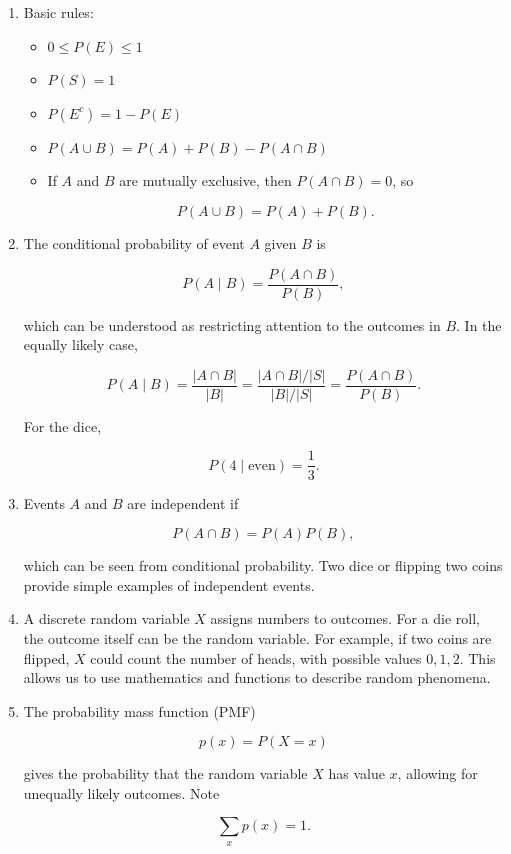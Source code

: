 \documentclass{article}
\begin{document}
\begin{enumerate}
\begin{enumerate}
For event $E={2,4,6}$, an even roll,

$$
P(E)=\frac{|E|}{|S|}=\frac{3}{6}=\frac{1}{2}.
$$

\item Basic rules:
\begin{itemize}
\item $0 \leq P(E) \leq 1$
\item $P(S)=1$
\item $P(E^c)=1-P(E)$
\item $P(A\cup B)=P(A)+P(B)-P(A\cap B)$
\item If $A$ and $B$ are mutually exclusive, then $P(A\cap B)=0$, so

$$
P(A\cup B)=P(A)+P(B).
$$

\end{itemize}

\item The conditional probability of event $A$ given $B$ is

$$
P(A\mid B)=\frac{P(A\cap B)}{P(B)},
$$

which can be understood as restricting attention to the outcomes in $B$. In the equally likely case,

$$
P(A\mid B)=\frac{|A\cap B|}{|B|}
=\frac{|A\cap B|/|S|}{|B|/|S|}
=\frac{P(A\cap B)}{P(B)}.
$$

For the dice,

$$
P(4\mid \text{even})=\frac{1}{3}.
$$

\item Events $A$ and $B$ are independent if

$$
P(A\cap B)=P(A)P(B),
$$

which can be seen from conditional probability. Two dice or flipping two coins provide simple examples of independent events.

\item A discrete random variable $X$ assigns numbers to outcomes. For a die roll, the outcome itself can be the random variable. For example, if two coins are flipped, $X$ could count the number of heads, with possible values ${0,1,2}$. This allows us to use mathematics and functions to describe random phenomena.

\item The probability mass function (PMF)

$$
p(x)=P(X=x)
$$

gives the probability that the random variable $X$ has value $x$, allowing for unequally likely outcomes. Note

$$
\sum_x p(x)=1.
$$


\end{enumerate}
\end{enumerate}
\end{document}
